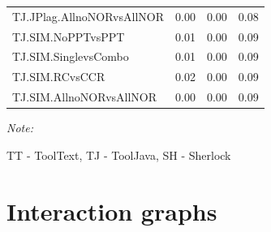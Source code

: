 \documentclass[a4paper, 12pt, oneside, openany, final, pdftex]{book}\usepackage[]{graphicx}\usepackage[]{color}
\begin{document}
\begin{appendices}
\begin{table}
\begin{threeparttable}
\begin{tabular}{lrrr}
TJ.JPlag.AllnoNORvsAllNOR & 0.00 & 0.00 & 0.08\\
\rowcolor{gray!6}  TJ.SIM.NoPPTvsPPT & 0.01 & 0.00 & 0.09\\
TJ.SIM.SinglevsCombo & 0.01 & 0.00 & 0.09\\
\rowcolor{gray!6}  TJ.SIM.RCvsCCR & 0.02 & 0.00 & 0.09\\
TJ.SIM.AllnoNORvsAllNOR & 0.00 & 0.00 & 0.09\\
\bottomrule
\end{tabular}
\begin{tablenotes}
\item \textit{Note: } 
\item TT - ToolText, TJ - ToolJava, SH - Sherlock
\end{tablenotes}
\end{threeparttable}


\end{table}
  \chapter{Interaction graphs}\label{apx:interactionGraphs}

  


\end{appendices}
\end{document}
